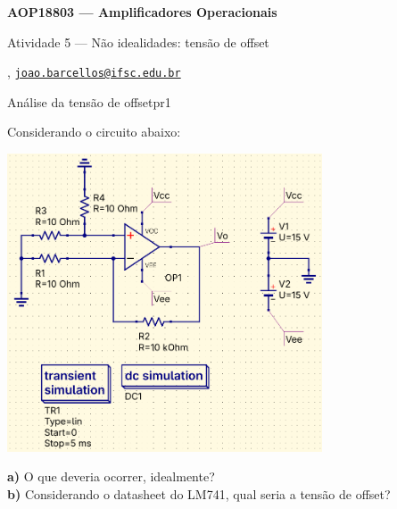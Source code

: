 



\usepackage[style=numeric, citestyle=ieee]{biblatex}




\begin{Large}
    \textbf{AOP18803 --- Amplificadores Operacionais}
    
    Atividade 5 --- Não idealidades: tensão de offset \hfill {}
\end{Large}

\vspace{1ex}
\textbf{} , \href{mailto:joao.barcellos@ifsc.edu.br}{\texttt{joao.barcellos@ifsc.edu.br}}\\
\textbf{}

\vspace{2ex}

\begin{problem}{Análise da tensão de offset}{pr1}

Considerando o circuito abaixo: \\
    
\begin{center}
    \includegraphics[width=0.7\textwidth]{./figures/offset.png}
\end{center}

\textbf{a)} O que deveria ocorrer, idealmente? \\

\textbf{b)} Considerando o datasheet do LM741, qual seria a tensão de offset? \\

\end{problem}

